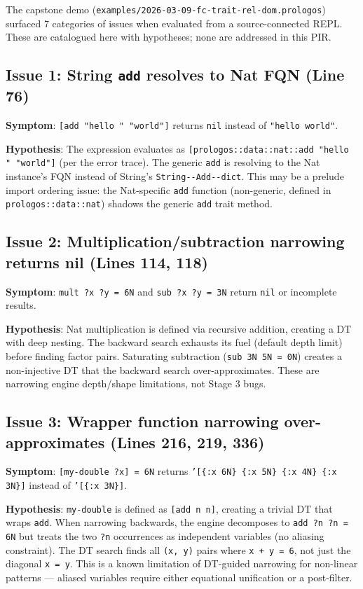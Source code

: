 \documentclass[11pt]{article}
\begin{document}
The capstone demo (\texttt{examples/2026-03-09-fc-trait-rel-dom.prologos}) surfaced 7
categories of issues when evaluated from a source-connected REPL. These are
catalogued here with hypotheses; none are addressed in this PIR.
\subsection{Issue 1: String \texttt{add} resolves to Nat FQN (Line 76)}
\label{sec:org4fa6348}

\textbf{Symptom}: \texttt{[add "hello " "world"]} returns \texttt{nil} instead of \texttt{"hello world"}.

\textbf{Hypothesis}: The expression evaluates as \texttt{[prologos::data::nat::add "hello " "world"]}
(per the error trace). The generic \texttt{add} is resolving to the Nat instance's FQN
instead of String's \texttt{String-{}-{}Add-{}-{}dict}. This may be a prelude import ordering issue:
the Nat-specific \texttt{add} function (non-generic, defined in \texttt{prologos::data::nat}) shadows
the generic \texttt{add} trait method.
\subsection{Issue 2: Multiplication/subtraction narrowing returns nil (Lines 114, 118)}
\label{sec:org237c13d}

\textbf{Symptom}: \texttt{mult ?x ?y = 6N} and \texttt{sub ?x ?y = 3N} return \texttt{nil} or incomplete results.

\textbf{Hypothesis}: Nat multiplication is defined via recursive addition, creating a DT
with deep nesting. The backward search exhausts its fuel (default depth limit) before
finding factor pairs. Saturating subtraction (\texttt{sub 3N 5N = 0N}) creates a non-injective
DT that the backward search over-approximates. These are narrowing engine depth/shape
limitations, not Stage 3 bugs.
\subsection{Issue 3: Wrapper function narrowing over-approximates (Lines 216, 219, 336)}
\label{sec:org6c516d2}

\textbf{Symptom}: \texttt{[my-double ?x] = 6N} returns \texttt{'[\{:x 6N\} \{:x 5N\} \{:x 4N\} \{:x 3N\}]}
instead of \texttt{'[\{:x 3N\}]}.

\textbf{Hypothesis}: \texttt{my-double} is defined as \texttt{[add n n]}, creating a trivial DT that wraps
\texttt{add}. When narrowing backwards, the engine decomposes to \texttt{add ?n ?n = 6N} but treats
the two \texttt{?n} occurrences as independent variables (no aliasing constraint). The DT
search finds all \texttt{(x, y)} pairs where \texttt{x + y = 6}, not just the diagonal \texttt{x = y}.
This is a known limitation of DT-guided narrowing for non-linear patterns — aliased
variables require either equational unification or a post-filter.
\end{document}
